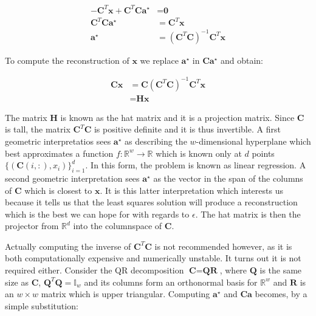 \documentclass[12pt,a4paper,oneside,english]{UPBThesis}
\newcommand{\hctimes}[2]{{#1}\!\times\!{#2}}
\newcommand{\hcsignalspace}{\mathbb{R}^d}
\newcommand{\hcweightspace}{\mathbb{R}^w}
\begin{document}
\begin{align*}
- \textbf{C}^T \textbf{x} + \textbf{C}^T\textbf{C}\textbf{a}^\star & = \textbf{0} \\
\textbf{C}^T\textbf{C}\textbf{a}^\star & = \textbf{C}^T\textbf{x} \\
\textbf{a}^\star & = {\left( \textbf{C}^T\textbf{C} \right)}^{-1} \textbf{C}^T\textbf{x}
\end{align*}

To compute the reconstruction of $\textbf{x}$ we replace $\textbf{a}^\star$ in $\textbf{C}\textbf{a}^\star$ and obtain:

\begin{align*}
\textbf{C}\textbf{x} & = \textbf{C}{\left( \textbf{C}^T\textbf{C} \right)}^{-1} \textbf{C}^T\textbf{x} \\
& = \textbf{H}\textbf{x}
\end{align*}

The matrix $\textbf{H}$ is known as the hat matrix and it is a projection matrix. Since $\textbf{C}$ is tall, the matrix $\textbf{C}^T\textbf{C}$ is positive definite and it is thus invertible. A first geometric interpretatios sees $\textbf{a}^\star$ as describing the $w$-dimensional hyperplane which best approximates a function $f:\hcweightspace \rightarrow \mathbb{R}$ which is known only at $d$ points $\{(\textbf{C}(i,:),x_i)\}_{i=1}^d$. In this form, the problem is known as linear regression. A second geometric interpretation sees $\textbf{a}^\star$ as the vector in the span of the columns of $\textbf{C}$ which is closest to $\textbf{x}$. It is this latter interpretation which interests us because it tells us that the least squares solution will produce a reconstruction which is the best we can hope for with regards to $\epsilon$. The hat matrix is then the projector from $\hcsignalspace$ into the columnspace of $\textbf{C}$.

Actually computing the inverse of $\textbf{C}^T\textbf{C}$ is not recommended however, as it is both computationally expensive and numerically unstable. It turns out it is not required either. Consider the QR decomposition $\textbf{C} = \textbf{Q}\textbf{R}$, where $\textbf{Q}$ is the same size as $\textbf{C}$, $\textbf{Q}^T\textbf{Q} = \mathbb{I}_w$ and its columns form an orthonormal basis for $\hcweightspace$ and $\textbf{R}$ is an $\hctimes{w}{w}$ matrix which is upper triangular. Computing $\textbf{a}^\star$ and $\textbf{C}\textbf{a}$ becomes, by a simple substitution:
\end{document}
